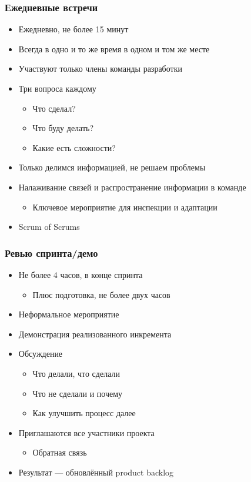 \documentclass{../../slides-style}
\begin{document}
    \begin{frame}
        \frametitle{Ежедневные встречи}
        \begin{itemize}
            \item Ежедневно, не более 15 минут
            \item Всегда в одно и то же время в одном и том же месте
            \item Участвуют только члены команды разработки
            \item Три вопроса каждому
            \begin{itemize}
                \item Что сделал?
                \item Что буду делать?
                \item Какие есть сложности?
            \end{itemize}
            \item Только делимся информацией, не решаем проблемы
            \item Налаживание связей и распространение информации в команде
            \begin{itemize}
                \item Ключевое мероприятие для инспекции и адаптации
            \end{itemize}
            \item Scrum of Scrums
        \end{itemize}
    \end{frame}

    \begin{frame}
        \frametitle{Ревью спринта/демо}
        \begin{itemize}
            \item Не более 4 часов, в конце спринта
            \begin{itemize}
                \item Плюс подготовка, не более двух часов
            \end{itemize}
            \item Неформальное мероприятие
            \item Демонстрация реализованного инкремента
            \item Обсуждение
            \begin{itemize}
                \item Что делали, что сделали
                \item Что не сделали и почему
                \item Как улучшить процесс далее
            \end{itemize}
            \item Приглашаются все участники проекта
            \begin{itemize}
                \item Обратная связь
            \end{itemize}
            \item Результат --- обновлённый product backlog
        \end{itemize}
    \end{frame}
\end{document}
